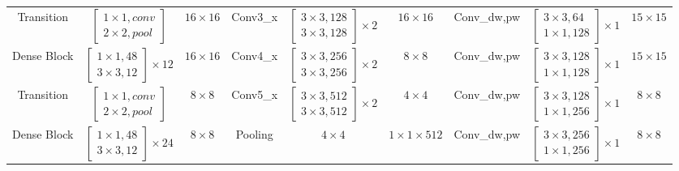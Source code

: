 \begin{table}[width=2\linewidth]
\begin{tabular*}{\tblwidth}{CCC|CCC|CCC}
Transition& $\begin{bmatrix}1\times1,conv\\2\times2,pool\end{bmatrix}$&$16\times16$&
Conv3\_x& $\begin{bmatrix}3\times3,128\\3\times3,128\end{bmatrix}\times2$& $16\times16$&
Conv\_dw,pw&$\begin{bmatrix}3\times3,64\\1\times1,128\end{bmatrix}\times1$ & $15\times15$\\ 
Dense Block& $\begin{bmatrix}1\times1,48\\3\times3,12\end{bmatrix}\times12$ &$16\times16$&
Conv4\_x& $\begin{bmatrix}3\times3,256\\3\times3,256\end{bmatrix}\times2$& $8\times8$&
Conv\_dw,pw&$\begin{bmatrix}3\times3,128\\1\times1,128\end{bmatrix}\times1$ & $15\times15$\\
Transition& $\begin{bmatrix}1\times1,conv\\2\times2,pool\end{bmatrix}$&$8\times8$&
Conv5\_x& $\begin{bmatrix}3\times3,512\\3\times3,512\end{bmatrix}\times2$& $4\times4$&
Conv\_dw,pw&$\begin{bmatrix}3\times3,128\\1\times1,256\end{bmatrix}\times1$ & $8\times8$ \\ 
Dense Block& $\begin{bmatrix}1\times1,48\\3\times3,12\end{bmatrix}\times24$ &$8\times8$&
Pooling& $4\times4$& $1\times1\times512$&
Conv\_dw,pw&$\begin{bmatrix}3\times3,256\\1\times1,256\end{bmatrix}\times1$ & $8\times8$\\

\end{tabular*}
\end{table}
